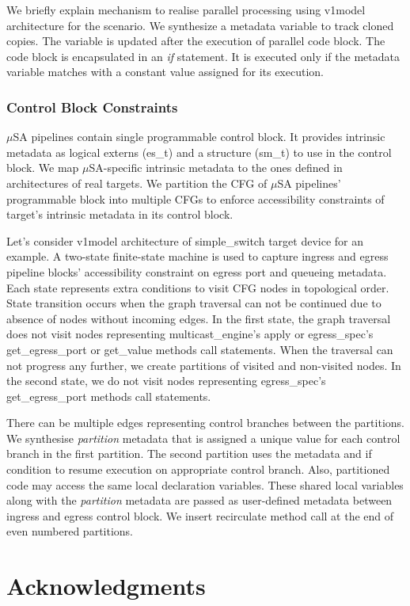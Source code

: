 \documentclass{hotnets19}
\begin{document}
We briefly explain mechanism to realise parallel processing using v1model architecture for the scenario.
We synthesize a metadata variable to track cloned copies. 
The variable is updated after the execution of parallel code block.
The code block is encapsulated in an \emph{if} statement. 
It is executed only if the metadata variable matches with a constant value assigned for its execution.


\subsubsection{Control Block Constraints}
$\mu$SA pipelines contain single programmable control block. 
It provides intrinsic metadata as logical externs (es\_t) and a structure (sm\_t) to use in the control block.
We map $\mu$SA-specific intrinsic metadata to the ones defined in architectures of real targets.
We partition the CFG of $\mu$SA pipelines' programmable block into multiple CFGs to enforce accessibility constraints of target's intrinsic metadata in its control block.

Let's consider v1model architecture of simple\_switch target device for an example.
A two-state finite-state machine is used to capture ingress and egress pipeline blocks'  accessibility constraint on egress port and queueing metadata.
Each state represents extra conditions to visit CFG nodes in topological order.
State transition occurs when the graph traversal can not be continued due to absence of nodes without incoming edges.
In the first state, the graph traversal does not visit nodes representing multicast\_engine's apply or egress\_spec's get\_egress\_port or get\_value methods call statements.
When the traversal can not progress any further, we create partitions of visited and non-visited nodes.
In the second state, we do not visit nodes representing egress\_spec's get\_egress\_port methods call statements.


There can be multiple edges representing control branches between the partitions.
We synthesise \emph{partition} metadata that is assigned a unique value for each control branch in the first partition.
The second partition uses the metadata and if condition to resume execution on appropriate control branch.
Also, partitioned code may access the same local declaration variables.
These shared local variables along with the \emph{partition} metadata are passed as user-defined metadata between ingress and egress control block.
We insert recirculate method call at the end of even numbered partitions.


\section*{Acknowledgments}

 
\begin{small}

\end{small}
\end{document}

